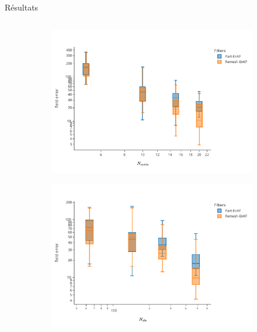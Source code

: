 \documentclass[aspectratio=169]{beamer} %
\begin{document}
\begin{frame}{Résultats}
    \begin{columns}[t]
        \begin{column}{0.5\textwidth}
            \centering
            \begin{figure}
                \begin{subfigure}{\textwidth}
                    \centering
                    \includegraphics[height=0.40\textheight]{../../conference/images/dipole_results/MSE_na_box_log_log.pdf}
                \end{subfigure}
                \begin{subfigure}{\textwidth}
                    \centering
                    \includegraphics[height=0.40\textheight]{../../conference/images/dipole_results/MSE_nobs_box_log_log.pdf}

\end{subfigure}
\end{figure}
\end{column}
\end{columns}
\end{frame}
\end{document}
